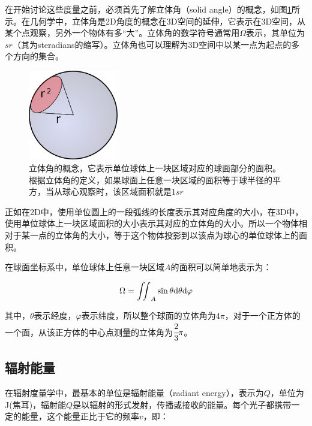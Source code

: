 在开始讨论这些度量之前，必须首先了解立体角（solid angle）的概念，如图\ref{f:intro-solid-angle}所示。在几何学中，立体角是2D角度的概念在3D空间的延伸，它表示在3D空间，从某个点观察，另外一个物体有多“大”。立体角的数学符号通常用$\Omega$表示，其单位为$sr$（其为steradians的缩写）。立体角也可以理解为3D空间中以某一点为起点的多个方向的集合。

\begin{figure}
\sidecaption
	\includegraphics[width=0.35\textwidth]{figures/intro/solid-angle}
	\caption{立体角的概念，它表示单位球体上一块区域对应的球面部分的面积。根据立体角的定义，如果球面上任意一块区域的面积等于球半径的平方，当从球心观察时，该区域面积就是$1sr$}
	\label{f:intro-solid-angle}
\end{figure}

正如在2D中，使用单位圆上的一段弧线的长度表示其对应角度的大小，在3D中，使用单位球体上一块区域面积的大小表示其对应的立体角的大小。所以一个物体相对于某一点的立体角的大小，等于这个物体投影到以该点为球心的单位球体上的面积。

在球面坐标系中，单位球体上任意一块区域$A$的面积可以简单地表示为：

\begin{equation}
	\Omega= {\rm \iint}_A \sin\theta {\rm d}\theta {\rm d}\varphi
\end{equation}

\noindent 其中，$\theta$表示经度，$\varphi$表示纬度，所以整个球面的立体角为$4\pi$，对于一个正方体的一个面，从该正方体的中心点测量的立体角为$ \cfrac{2}{3}\pi$。





\subsection{辐射能量} 
在辐射度量学中，最基本的单位是辐射能量（radiant energy），表示为$Q$，单位为J(焦耳)，辐射能$Q$是以辐射的形式发射，传播或接收的能量。每个光子都携带一定的能量，这个能量正比于它的频率$v$，即：

